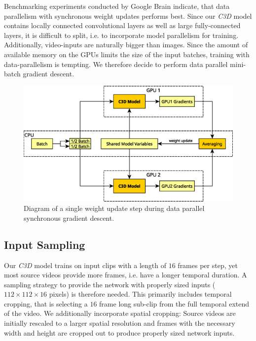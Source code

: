 Benchmarking experiments conducted by Google Brain \cite{chen_revisiting_2016} indicate, that data parallelism with synchronous weight updates performs best.
Since our \textit{C3D} model contains locally connected convolutional layers as well as large fully-connected layers, it is difficult to split, i.e. to incorporate model parallelism for training.
Additionally, video-inputs are naturally bigger than images.
Since the amount of available memory on the GPUs limits the size of the input batches, training with data-parallelism is tempting.
We therefore decide to perform data parallel mini-batch gradient descent.

\begin{figure}[H]
    \centering
    \includegraphics[width=\textwidth]{img_approach/gradient_averaging.eps}
    \caption{Diagram of a single weight update step during data parallel synchronous gradient descent.}
    \label{fig:gradient_averaging}
\end{figure}


\subsection{Input Sampling}
\label{subsec:inputsampling}
Our \textit{C3D} model trains on input clips with a length of $16$ frames per step, yet most source videos provide more frames, i.e. have a longer temporal duration.
A sampling strategy to provide the network with properly sized inputs ($112 \times 112 \times 16$ pixels) is therefore needed.
This primarily includes temporal cropping, that is selecting a $16$ frame long sub-clip from the full temporal extend of the video.
We additionally incorporate spatial cropping: Source videos are initially rescaled to a larger spatial resolution and frames with the necessary width and height are cropped out to produce properly sized network inputs.


